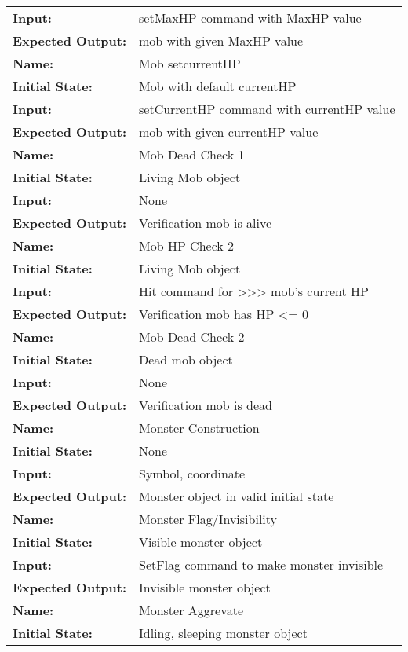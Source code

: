 \documentclass[12pt, titlepage]{article}
\begin{document}
\begin{center}
\begin{longtable}{ l | p{10cm} }
				\textbf{Input:} & setMaxHP command with MaxHP value\\
				\textbf{Expected Output:} & mob with given MaxHP value\\
				\hline
				\textbf{Name:} & Mob setcurrentHP\\
				\textbf{Initial State:} & Mob with default currentHP\\
				\textbf{Input:} & setCurrentHP command with currentHP value\\
				\textbf{Expected Output:} & mob with given currentHP value\\
				\hline
				\textbf{Name:} & Mob Dead Check 1\\
				\textbf{Initial State:} & Living Mob object\\
				\textbf{Input:} & None\\
				\textbf{Expected Output:} & Verification mob is alive\\
				\hline
				\textbf{Name:} & Mob HP Check 2\\
				\textbf{Initial State:} & Living Mob object\\
				\textbf{Input:} & Hit command for >>> mob's current HP\\
				\textbf{Expected Output:} & Verification mob has HP <= 0\\
				\hline
				\textbf{Name:} & Mob Dead Check 2\\
				\textbf{Initial State:} & Dead mob object\\
				\textbf{Input:} & None\\
				\textbf{Expected Output:} & Verification mob is dead\\
				\hline
				\textbf{Name:} & Monster Construction\\
				\textbf{Initial State:} & None\\
				\textbf{Input:} & Symbol, coordinate\\
				\textbf{Expected Output:} & Monster object in valid initial state\\
				\hline
				\textbf{Name:} & Monster Flag/Invisibility\\
				\textbf{Initial State:} & Visible monster object\\
				\textbf{Input:} & SetFlag command to make monster invisible\\
				\textbf{Expected Output:} & Invisible monster object\\
				\hline
				\textbf{Name:} & Monster Aggrevate\\
				\textbf{Initial State:} & Idling, sleeping monster object\\

\end{longtable}
\end{center}
\end{document}
